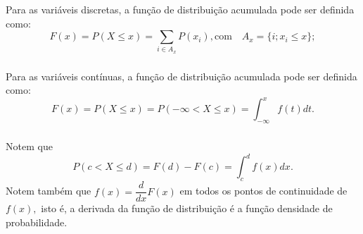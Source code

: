 \documentclass[14pt,aspectratio=1610]{beamer}
\begin{document}
\begin{frame}{}
\frametitle{}
\begin{block}{}
\justifying
Para as variáveis discretas, a função de distribuição acumulada pode ser definida como: $$\displaystyle F(x)=P(X\leq x)=\sum_{i\in A_{x}}P(x_{i}),\textrm{com}\quad
A_{x}=\{i;x_{i}\leq x\};$$
\end{block}
\end{frame}

\begin{frame}{}
\frametitle{}
\begin{block}{}
\justifying
Para as variáveis contínuas, a função de distribuição acumulada pode ser definida como: $$\displaystyle F(x)=P(X\leq x)=P(-\infty <X\leq x)=\int_{-\infty}^{x}f(t)dt.$$
\end{block}
\end{frame}

\begin{frame}{}
\frametitle{}
\begin{block}{}
\justifying
Notem que $$P(c<X\leq d)=F(d)-F(c)=\int_{c}^{d}f(x)dx.$$ Notem também que $f(x)=\dfrac{d}{dx}F(x)$ em todos os pontos de continuidade de $f(x),$ isto é, a derivada da
função de distribuição é a função densidade de probabilidade.
\end{block}
\end{frame}
\end{document}

